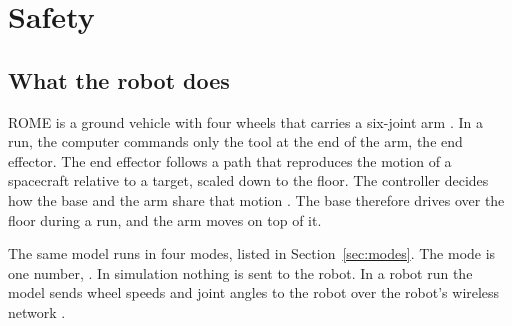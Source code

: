 \documentclass[11pt]{article}
\newcommand{\cmd}[1]{\texttt{\romecode{#1}}}
\newif\ifshowsrc
\newcommand{\src}[1]{\ifshowsrc{\scriptsize\,[\texttt{\romecode{#1}}]}\fi}
\begin{document}
\section{Safety}\label{sec:safety}

\subsection*{What the robot does}
ROME is a ground vehicle with four wheels that carries a six-joint arm
\src{lab_settings.m:115; define_constants.m:96}. In a run, the computer commands only the
tool at the end of the arm, the end effector. The end effector follows a path that reproduces the
motion of a spacecraft relative to a target, scaled down to the floor. The controller decides
how the base and the arm share that motion \src{lab_settings.m:23-28; define_constants.m:61-70}.
The base therefore drives over the floor during a run, and the arm moves on top of it.

The same model runs in four modes, listed in Section~\ref{sec:modes}. The mode is one number,
\cmd{run_mode}. In simulation nothing is sent to the robot. In a robot run the model sends
wheel speeds and joint angles to the robot over the robot's wireless network
\src{run_mode_table.m:5; docs/lab/PART_C_LAB_VISIT.md:86}.
\end{document}
